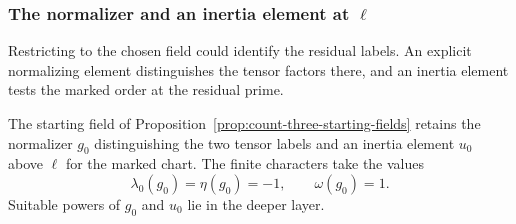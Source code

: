 \subsubsection{The normalizer and an inertia element at \(\ell\)}

Restricting to the chosen field could identify the residual labels. An explicit normalizing element distinguishes the tensor factors there, and an inertia element tests the marked order at the residual prime.

\begin{proposition}\label{prop:count-three-marked-elements}
The starting field of Proposition~\ref{prop:count-three-starting-fields}
retains the normalizer \(g_0\) distinguishing the two tensor labels
and an inertia element \(u_0\) above \(\ell\) for the marked chart. The finite characters take the values 
\[
 \lambda_0(g_0)=\eta(g_0)=-1,\qquad \omega(g_0)=1.
\]
 Suitable powers of \(g_0\) and \(u_0\) lie in the deeper layer.
\end{proposition}

